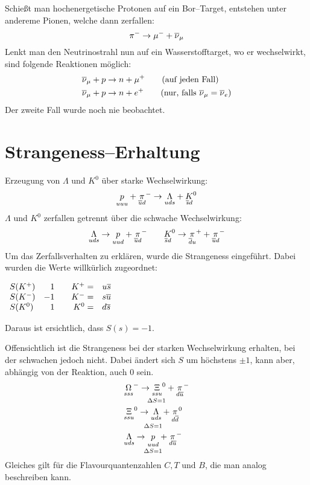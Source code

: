 \documentclass[Ex4_Zusammenfassung.tex]{subfiles}
\begin{document}
Schießt man hochenergetische Protonen auf ein Bor--Target, entstehen unter andereme Pionen, welche dann zerfallen:
\begin{equation}
	\pi^- \rightarrow \mu^- + \overline{\nu}_\mu
\end{equation}
Lenkt man den Neutrinostrahl nun auf ein Wasserstofftarget, wo er wechselwirkt, sind folgende Reaktionen möglich:
\begin{align}
	\overline{\nu}_\mu + p &\rightarrow n + \mu^+ \qquad \text{(auf jeden Fall)}\\
	\overline{\nu}_\mu + p &\rightarrow n + e^+ \qquad \text{(nur, falls } \overline{\nu}_\mu = \overline{\nu}_e\text{)}
\end{align}
Der zweite Fall wurde noch nie beobachtet.

\section{Strangeness--Erhaltung}
Erzeugung von $\Lambda$ und $K^0$ über starke Wechselwirkung:
\begin{equation}
	\underset{uuu}{p} + \underset{\overline{u}d}{\pi}^- \rightarrow \underset{uds}{\Lambda} + \underset{\overline{s}d}{K}^0
\end{equation}
$\Lambda$ und $K^0$ zerfallen getrennt über die schwache Wechselwirkung:
\begin{equation}
	\underset{uds}{\Lambda} \rightarrow \underset{uud}{p} + \underset{\overline{u}d}{\pi}^- \qquad \underset{\overline{s}d}{K}^0 \rightarrow \underset{\overline{d}u}{\pi}^+ + \underset{\overline{u}d}{\pi}^-
\end{equation}
Um das Zerfallsverhalten zu erklären, wurde die Strangeness eingeführt. Dabei wurden die Werte willkürlich zugeordnet:
\begin{table}[H]
	\centering
	$
	\begin{array}{lrcrl}
	S(K^+) & 1 && K^+= & u\overline{s} \\ 
	S(K^-) & -1 && K^-=& s\overline{u} \\ 
	S(K^0) & 1 &&K^0= & d\overline{s}
	\end{array} 
	$
\end{table}
Daraus ist ersichtlich, dass $S(s)=-1$.

Offensichtlich ist die Strangeness bei der starken Wechselwirkung erhalten, bei der schwachen jedoch nicht. Dabei ändert sich $S$ um höchstens $\pm 1$, kann aber, abhängig von der Reaktion, auch $0$ sein.
\begin{align}
	&\underset{\Delta S = 1}{\underset{sss}{\Omega}^- \rightarrow \underset{ssu}{\Xi}^0 + \underset{d\overline{u}}{\pi}^- }\\
	&\underset{\Delta S = 1}{\underset{ssu}{\Xi}^0 \rightarrow \underset{uds}{\Lambda} + \underset{d\overline{d}}{\pi}^0}\\
	& \underset{\Delta S = 1}{\underset{uds}{\Lambda} \rightarrow \underset{uud}{p} + \underset{d\overline{u}}{\pi}^-}
\end{align}
Gleiches gilt für die Flavourquantenzahlen $C,T \text{ und }B$, die man analog beschreiben kann. 
\end{document}
